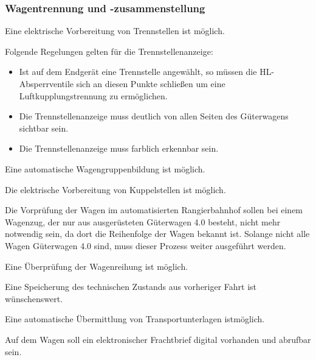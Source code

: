 \subsubsection{Wagentrennung und -zusammenstellung}
\begin{feat}
Eine elektrische Vorbereitung von Trennstellen ist möglich.
\end{feat}
\begin{rem} [zu Anf. 51]
Folgende Regelungen gelten für die Trennstellenanzeige:
\begin{itemize}
    \item Ist auf dem Endgerät eine Trennstelle angewählt, so müssen die \acrshort{HL}-Absperrventile sich an diesen Punkte schließen um eine Luftkupplungstrennung zu ermöglichen.
    \item Die Trennstellenanzeige muss deutlich von allen Seiten des Güterwagens sichtbar sein.
    \item Die Trennstellenanzeige muss farblich erkennbar sein.
\end{itemize}
\end{rem}
\begin{feat}
Eine automatische Wagengruppenbildung ist möglich.
\end{feat}
\begin{feat}
Die elektrische Vorbereitung von Kuppelstellen ist möglich.
\end{feat}
Die Vorprüfung der Wagen im automatisierten Rangierbahnhof sollen bei einem Wagenzug, der nur aus ausgerüsteten Güterwagen 4.0 besteht, nicht mehr notwendig sein, da dort die Reihenfolge der Wagen bekannt ist. Solange nicht alle Wagen Güterwagen 4.0 sind, muss dieser Prozess weiter ausgeführt werden.
\begin{feat}
Eine Überprüfung der Wagenreihung ist möglich.
\end{feat}
\begin{feat}
Eine Speicherung des technischen Zustands aus vorheriger Fahrt ist \newline wünschenswert.
\end{feat}
\begin{feat}
Eine automatische Übermittlung von Transportunterlagen ist\newline möglich.
\end{feat}
\begin{feat}
Auf dem Wagen soll ein elektronischer Frachtbrief digital vorhanden und abrufbar sein.
\end{feat}

